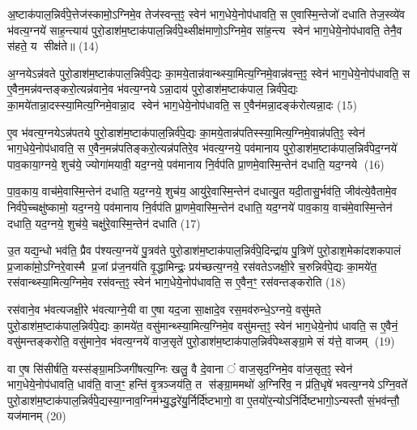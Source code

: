 अ॒ष्टाक॑पाल॒न्निर्व॑पे॒त्तेज॑स्कामो॒ऽग्निमे॒व तेज॑स्वन्त॒ꣵ॒ स्वेन॑ भाग॒धेये॒नोप॑धावति॒ स ए॒वास्मि॒न्तेजो॑ दधाति तेज॒स्व्ये॑व भ॑वत्य॒ग्नये॑ साह॒न्त्याय॑ पुरो॒डाश॑म॒ष्टाक॑पाल॒न्निर्व॑पे॒थ्सीक्ष॑माणो॒ऽग्निमे॒व सा॑ह॒न्त्य स्वेन॑ भाग॒धेये॒नोप॑धावति॒ तेनै॒व स॑हते॒ य सीक्ष॑ते॥ (14)

{\anuvakamend[{भ्रातृ॑व्यस्यास्मि॒न्तेज॑स्वते पुरो॒डाश॑म॒ष्टात्रिꣳ॑शच्च॥३॥}]}

अ॒ग्नयेऽन्न॑वते पुरो॒डाश॑म॒ष्टाक॑पाल॒न्निर्व॑पे॒द्यः का॒मये॒तान्न॑वान्थ्स्या॒मित्य॒ग्निमे॒वान्न॑वन्त॒ꣵ॒ स्वेन॑ भाग॒धेये॒नोप॑धावति॒ स ए॒वैन॒मन्न॑वन्तङ्करो॒त्यन्न॑वाने॒व भ॑वत्य॒ग्नयेऽन्ना॒दाय॑ पुरो॒डाश॑म॒ष्टाक॑पाल॒ न्निर्व॑पे॒द्यः का॒मये॑तान्ना॒दस्स्या॒मित्य॒ग्निमे॒वान्ना॒द स्वेन॑ भाग॒धेये॒नोप॑धावति॒ स ए॒वैन॑मन्ना॒दङ्क॑रोत्यन्ना॒दः (15)

ए॒व भ॑वत्य॒ग्नयेऽन्न॑पतये पुरो॒डाश॑म॒ष्टाक॑पाल॒न्निर्व॑पे॒द्यः का॒मये॒तान्न॑पतिस्स्या॒मित्य॒ग्निमे॒वान्न॑पति॒ꣵ॒ स्वेन॑ भाग॒धेये॒नोप॑धावति॒ स ए॒वैन॒मन्न॑पतिङ्करो॒त्यन्न॑पतिरे॒व भ॑वत्य॒ग्नये॒ पव॑मानाय पुरो॒डाश॑म॒ष्टाक॑पाल॒न्निर्व॑पेद॒ग्नये॑ पाव॒काया॒ग्नये॒ शुच॑ये॒ ज्योगा॑मयावी॒ यद॒ग्नये॒ पव॑मानाय नि॒र्वप॑ति प्रा॒णमे॒वास्मि॒न्तेन॑ दधाति॒ यद॒ग्नये (16)

पा॒व॒काय॒ वाच॑मे॒वास्मि॒न्तेन॑ दधाति॒ यद॒ग्नये॒ शुच॑य॒ आयु॑रे॒वास्मि॒न्तेन॑ दधात्यु॒त यदी॒तासु॒र्भव॑ति॒ जीव॑त्ये॒वैतामे॒व निर्व॑पे॒च्चक्षु॑ष्कामो॒ यद॒ग्नये॒ पव॑मानाय नि॒र्वप॑ति प्रा॒णमे॒वास्मि॒न्तेन॑ दधाति॒ यद॒ग्नये॑ पाव॒काय॒ वाच॑मे॒वास्मि॒न्तेन॑ दधाति॒ यद॒ग्नये॒ शुच॑ये॒ चक्षु॑रे॒वास्मि॒न्तेन॑ दधाति (17)

उ॒त यद्य॒न्धो भव॑ति॒ प्रैव प॑श्यत्य॒ग्नये॑ पु॒त्रव॑ते पुरो॒डाश॑म॒ष्टाक॑पाल॒न्निर्व॑पे॒दिन्द्रा॑य पु॒त्रिणे॑ पुरो॒डाश॒मेका॑दशकपालं प्र॒जाका॑मो़॒ऽग्निरे॒वास्मै प्र॒जां प्र॑ज॒नय॑ति वृ॒द्धामिन्द्रः॒ प्रय॑च्छत्य॒ग्नये॒ रस॑वतेऽजक्षी॒रे च॒रुन्निर्व॑पे॒द्यः का॒मये॑त॒ रस॑वान्थ्स्या॒मित्य॒ग्निमे॒व रस॑वन्त॒ꣵ॒ स्वेन॑ भाग॒धेये॒नोप॑धावति॒ स ए॒वैन॒ꣳ॒ रस॑वन्तङ्करोति (18)

रस॑वाने॒व भ॑वत्यजक्षी॒रे भ॑वत्याग्ने॒यी वा ए॒षा यद॒जा सा॒क्षादे॒व रस॒मव॑रुन्धे॒ऽग्नये॒ वसु॑मते पुरो॒डाश॑म॒ष्टाक॑पाल॒न्निर्व॑पे॒द्यः का॒मये॑त॒ वसु॑मान्थ्स्या॒मित्य॒ग्निमे॒व वसु॑मन्त॒ꣵ॒ स्वेन॑ भाग॒धेये॒नोप॑ धावति॒ स ए॒वैनं॒ वसु॑मन्तङ्करोति॒ वसु॑माने॒व भ॑वत्य॒ग्नये॑ वाज॒सृते॑ पुरो॒डाश॑म॒ष्टाक॑पाल॒न्निर्व॑पेथ्सङ्ग्रा॒मे सं य॑त्ते॒ वाजम् (19)

वा ए॒ष सि॑सीर्\mbox{}षति॒ यस्स॑ङ्ग्रा॒मञ्जिगी॑षत्य॒ग्निः खलु॒ वै दे॒वानां वाज॒सृद॒ग्निमे॒व वा॑ज॒सृत॒ꣵ॒ स्वेन॑ भाग॒धेये॒नोप॑धावति॒ धाव॑ति॒ वाज॒ꣳ॒ हन्ति॑ वृ॒त्रञ्जय॑ति॒ त स॑ङ्ग्रा॒ममथो॑ अ॒ग्निरि॑व॒ न प्र॑ति॒धृषे॑ भवत्य॒ग्नयेऽग्नि॒वते॑ पुरो॒डाश॑म॒ष्टाक॑पाल॒न्निर्व॑पे॒द्यस्या॒ग्नाव॒ग्निम॑भ्यु॒द्धरे॑यु॒र्निर्दि॑ष्टभागो॒ वा ए॒तयो॑र॒न्योऽनि॑र्दिष्टभागो॒ऽन्यस्तौ सं॒भव॑न्तौ॒ यज॑मानम् (20)

